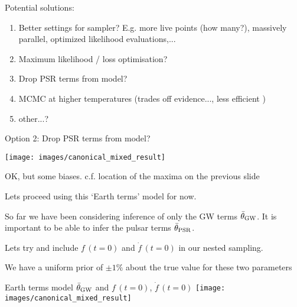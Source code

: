 \documentclass[10pt]{beamer}
\begin{document}
\begin{frame}{}
	Potential solutions:
	
	\begin{enumerate}
		\item Better settings for sampler? E.g. more live points (how many?), massively parallel, optimized likelihood evaluations,...
		\item Maximum likelihood / loss optimisation? 
		\item Drop PSR terms from model?
		\item MCMC at higher temperatures (trades off evidence..., less efficient	)
		\item other...?
	\end{enumerate}
	
	
\end{frame}





\begin{frame}{Option 2: Drop PSR terms from model?}
	
	
	\texttt{[image: images/canonical\_mixed\_result]}
	
	OK, but some biases. c.f. location of the maxima on the previous slide
\end{frame}



\begin{frame}{}
	
	Lets proceed using this `Earth terms' model for now. 
	
	
   So far we have been considering inference of only the GW terms $\bar{\theta}_{\rm GW}$. It is important to be able to infer the pulsar terms $\bar{\theta}_{\rm PSR}$.
   
   
   Lets try and include $f \, (t=0)$ and $\dot{f} \, (t=0)$ in our nested sampling.
   
   We have a uniform prior of $\pm 1 \%$ about the true value for these two parameters 
	
	
	

	

\end{frame}

\begin{frame}{Earth terms model $\bar{\theta}_{\rm GW}$ and $f \, (t=0)$, $\dot{f} \, (t=0)$}
	\texttt{[image: images/canonical\_mixed\_result]}
\end{frame}





	
\end{document}
